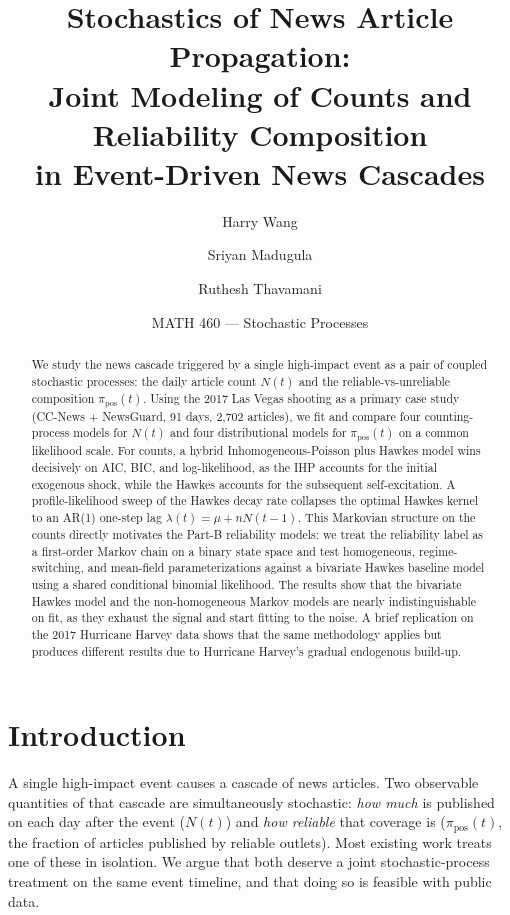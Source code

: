 \documentclass[11pt]{article}
\title{Stochastics of News Article Propagation: \\
       Joint Modeling of Counts and Reliability Composition \\
       in Event-Driven News Cascades}
\author{Harry Wang \and Sriyan Madugula \and Ruthesh Thavamani}
\date{MATH 460 --- Stochastic Processes}
\newcommand{\pipos}{\pi_{\mathrm{pos}}}
\begin{document}
\maketitle

\begin{abstract}
We study the news cascade triggered by a single high-impact event as a pair of
coupled stochastic processes: the daily article count $N(t)$ and the
reliable-vs-unreliable composition $\pipos(t)$. Using the 2017 Las Vegas
shooting as a primary case study (CC-News + NewsGuard, 91 days, 2{,}702
articles), we fit and compare four counting-process models for $N(t)$ and four
distributional models for $\pipos(t)$ on a common likelihood scale. For
counts, a hybrid Inhomogeneous-Poisson plus Hawkes model wins decisively
on AIC, BIC, and log-likelihood, as the IHP accounts for the initial exogenous shock,
while the Hawkes accounts for the subsequent self-excitation. A profile-likelihood
sweep of the Hawkes decay rate collapses the optimal Hawkes kernel to an
AR(1) one-step lag $\lambda(t)=\mu+n N(t-1)$. This Markovian structure on the
counts directly motivates the Part-B reliability models: we treat the
reliability label as a first-order Markov chain on a binary state space and
test homogeneous, regime-switching, and mean-field parameterizations against a
bivariate Hawkes baseline model using a shared conditional binomial likelihood.
The results show that the bivariate Hawkes model and the non-homogeneous Markov models 
are nearly indistinguishable on fit, as they exhaust the signal and start fitting to the noise. A
brief replication on the 2017 Hurricane Harvey data shows that the same methodology applies
but produces different results due to Hurricane Harvey's gradual endogenous build-up.
\end{abstract}

\section{Introduction}

A single high-impact event causes a cascade of news articles. Two observable
quantities of that cascade are simultaneously stochastic: \emph{how much} is
published on each day after the event ($N(t)$) and \emph{how reliable} that
coverage is ($\pipos(t)$, the fraction of articles published by reliable
outlets). Most existing work treats one of these in isolation. We argue that
both deserve a joint stochastic-process treatment on the same event timeline,
and that doing so is feasible with public data.
\end{document}
